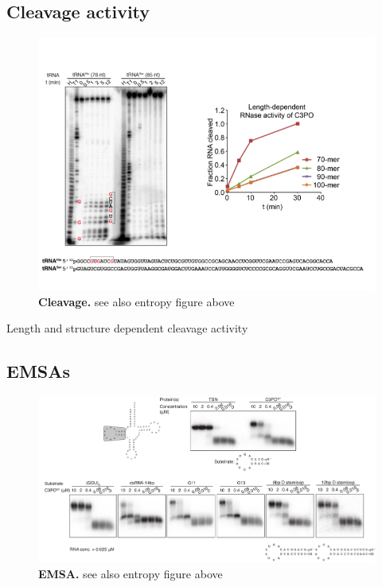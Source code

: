 \documentclass[12pt]{rockefeller}
\begin{document}
\subsection{Cleavage activity}

\begin{figure}[!ht]%
\centering
\includegraphics[width=\textwidth]{cleavage2.png} 
\caption[Cleavage.]
{
\textbf{Cleavage.}
see also entropy figure above
}
\centering
\label{motifs}%
\end{figure}

Length and structure dependent cleavage activity

\subsection{EMSAs}
\begin{figure}[!ht]%
\centering
\includegraphics[width=\textwidth]{emsa.png} 
\caption[EMSA.]
{
\textbf{EMSA.}
see also entropy figure above
}
\centering
\label{motifs}%
\end{figure}
\end{document}
